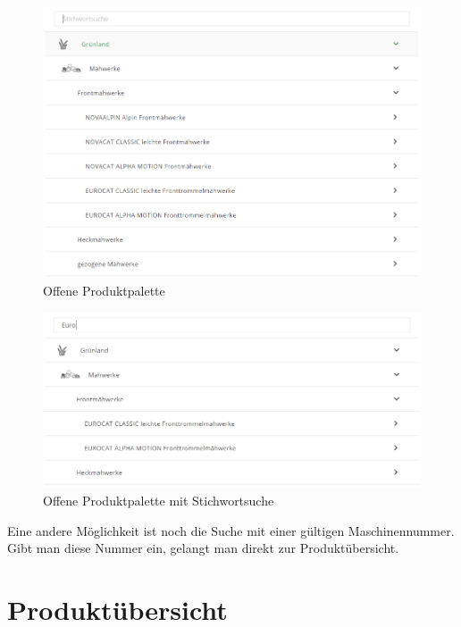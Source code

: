 \begin{figure}[H]
	\centerline{
		\includegraphics[width=1\textwidth, frame]{./grafiken/erm_produktpalette_offen.png}
	}
	\vskip0pt
	\caption{Offene Produktpalette} \label{fig:produktpaletteOffen}
\end{figure}

\begin{figure}[H]
	\centerline{
		\includegraphics[width=1\textwidth, frame]{./grafiken/erm_produktpalette_offen_stichwort.PNG}
	}
	\vskip0pt
	\caption{Offene Produktpalette mit Stichwortsuche} \label{fig:produktpaletteMitStichwort}
\end{figure}

Eine andere Möglichkeit ist noch die Suche mit einer gültigen Maschinennummer. Gibt man diese Nummer ein, gelangt man direkt zur Produktübersicht.

\section{Produktübersicht}

